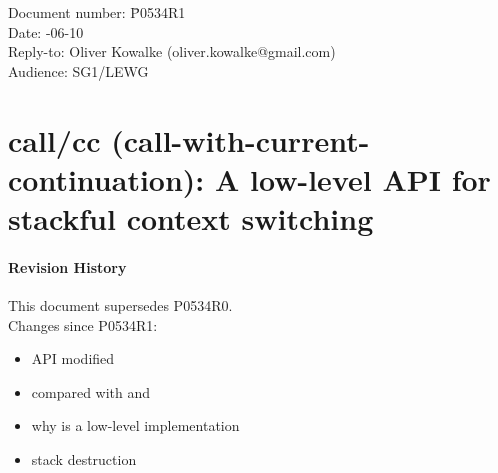 \documentclass[fontsize=10pt,paper=A4,pagesize,DIV=15]{scrartcl}
\begin{document}
\small
\begin{tabbing}
    Document number: \= P0534R1\\
    Date:            -06-10\\
    Reply-to:        \> Oliver Kowalke (oliver.kowalke@gmail.com)\\
    Audience:        \> SG1/LEWG\\
\end{tabbing}

\section*{call/cc (call-with-current-continuation): A low-level API for stackful context switching}


\tableofcontents


\paragraph*{Revision History}
This document supersedes P0534R0.\\
\newline
Changes since P0534R1:

\begin{itemize}
    \item API modified
    \item \cc compared with \uc and \lj
    \item why \cc is a low-level implementation
    \item stack destruction
\end{itemize}










\end{document}
